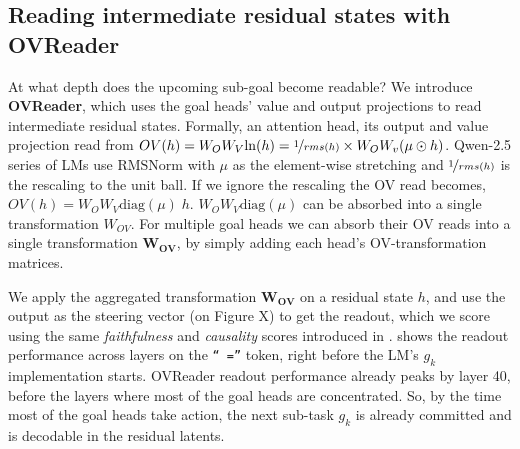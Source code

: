 
\subsection{Reading intermediate residual states with OVReader}
\label{sec:mechanism:upstream}

At what depth does the upcoming sub-goal become readable? We introduce \textbf{OVReader}, which uses the goal heads' value and output projections to read intermediate residual states. Formally, an attention head, its output and value projection read from $OV(h) = W_OW_V \mathrm{ln}(h) = \nicefrac{1}{rms(h)} \times W_OW_v(\mu \odot h)$. Qwen-2.5 series of LMs use $\mathrm{RMSNorm}$ with $\mu$ as the element-wise stretching and $\nicefrac{1}{rms(h)}$ is the rescaling to the unit ball. If we ignore the rescaling the OV read becomes, $OV(h) = W_OW_V\mathrm{diag}(\mu)\;h$. $W_OW_V\mathrm{diag}(\mu)$ can be absorbed into a single transformation $W_{OV}$. For multiple goal heads we can absorb their OV reads into a single transformation  $\mathbf{W_{OV}}$, by simply adding each head's OV-transformation matrices.

We apply the aggregated transformation $\mathbf{W_{OV}}$ on a residual state $h$, and use the output as the steering vector (on {\color{red} Figure X}) to get the readout, which we score using the same \emph{faithfulness} and \emph{causality} scores introduced in .  shows the readout performance across layers on the \texttt{`` =''} token, right before the LM's $g_k$ implementation starts. OVReader readout performance already peaks by layer 40, before the layers where most of the goal heads are concentrated. So, by the time most of the goal heads take action, the next sub-task $g_k$ is already committed and is decodable in the residual latents. 


